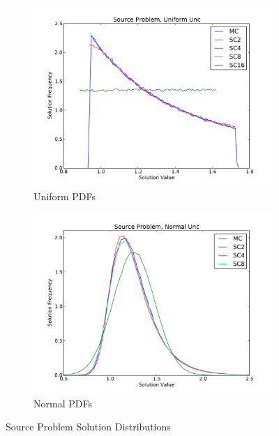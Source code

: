 \begin{figure}[h]
\centering
  \begin{subfigure}[b]{0.45 \textwidth}
   \includegraphics[width=\textwidth]{../graphics/source_uniform_pdfs}
   \caption{Uniform PDFs}
      \label{uni}
  \end{subfigure}
  \begin{subfigure}[b]{0.45\textwidth}
   \includegraphics[width=\textwidth]{../graphics/source_normal_pdfs}
   \caption{Normal PDFs}
      \label{norm}
  \end{subfigure}
\caption{Source Problem Solution Distributions}
\label{fig:sourcepdfs}
\end{figure}

